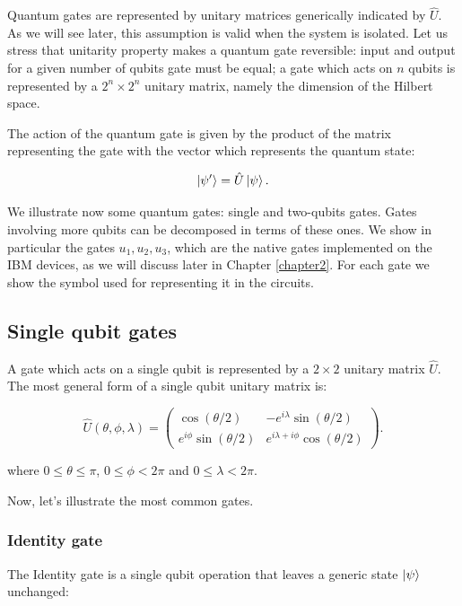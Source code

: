 Quantum gates are represented by unitary matrices generically indicated by $\hat{U}$. 
As we will see later, this assumption is valid when the system is isolated.
Let us stress that unitarity property makes a quantum gate reversible: input and output for a given number of qubits gate must be equal; a gate which acts on $n$ qubits is represented by a $2^{n}\times 2^{n}$ unitary matrix, namely the dimension of the Hilbert space.

The action of the quantum gate is given by the product of the matrix representing the gate with the vector which represents the quantum state:
 
 \begin{equation}
  \left| \psi ' \right \rangle= \hat{U} \left| \psi \right \rangle.
  \label{6_firstchapter}
  \end{equation}
 
 \noindent We illustrate now some quantum gates: single and two-qubits gates. Gates involving more qubits can be decomposed in terms of these ones.
We show in particular the gates $u_1, u_2, u_3$, which are the native gates implemented on the IBM devices, as we will discuss later in Chapter \ref{chapter2}.
For each gate we show the symbol used for representing it in the circuits.

 
\subsection{Single qubit gates}  %
A gate which acts on a single qubit is represented by a $2\times 2$ unitary matrix $\hat{U}$. The most general form of a single qubit unitary matrix \cite{TutorialQiskit}  is:

\begin{equation}
 \hat{U}(\theta,\phi,\lambda) = \begin{pmatrix}
\cos(\theta/2) & -e^{i\lambda}\sin(\theta/2) \\
e^{i\phi}\sin(\theta/2) & e^{i\lambda+i\phi}\cos(\theta/2) 
\end{pmatrix}.
\label{U_general_gate}
\end{equation}

\noindent where $0\leq \theta \leq \pi$, $0\leq \phi < 2\pi$ and  $0\leq \lambda < 2 \pi$.

\noindent Now, let's illustrate the most common gates.

\subsubsection{Identity gate} %
The Identity gate is a single qubit operation that leaves a generic state $\left| \psi \right \rangle$ unchanged:

